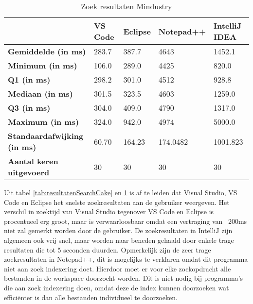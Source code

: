 \begin{table}[h!]
	\centering
	\begin{tabular}{ l l l l l }
		\hline
		                                    & \textbf{VS Code} & \textbf{Eclipse} & \textbf{Notepad++} & \textbf{IntelliJ IDEA} \\
		\hline
		\textbf{Gemiddelde (in ms)}         & 283.7            & 387.7            & 4643               & 1452.1                 \\[1ex]

		\textbf{Minimum (in ms) }           & 106.0            & 289.0            & 4425               & 820.0                  \\
		\textbf{Q1 (in ms)}                 & 298.2            & 301.0            & 4512               & 928.8                  \\
		\textbf{Mediaan (in ms)}            & 301.5            & 323.5            & 4603               & 1259.0                 \\
		\textbf{Q3 (in ms)}                 & 304.0            & 409.0            & 4790               & 1317.0                 \\
		\textbf{Maximum (in ms)}            & 324.0            & 942.0            & 4974               & 5000.0                 \\[1ex]

		\textbf{Standaardafwijking (in ms)} & 60.70            & 164.23           & 174.0482           & 1001.823               \\
		\textbf{Aantal keren uitgevoerd}    & 30               & 30               & 30                 & 30                     \\
		\hline
	\end{tabular}
	\caption{Zoek resultaten Mindustry}
	\label{tab:resultatenSearchMindustry}
\end{table}

Uit tabel \ref{tab:resultatenSearchCake} en \ref{tab:resultatenSearchMindustry} is af te leiden dat Visual Studio, VS Code en Eclipse het snelste zoekresultaten aan de gebruiker weergeven. Het verschil in zoektijd van Visual Studio tegenover VS Code en Eclipse is procentueel erg groot, maar is verwaarloosbaar omdat een vertraging van ~200ms niet zal gemerkt worden door de gebruiker. De zoekresultaten in IntelliJ zijn algemeen ook vrij snel, maar worden naar beneden gehaald door enkele trage resultaten die tot 5 seconden duurden. Opmerkelijk zijn de zeer trage zoekresultaten in Notepad++, dit is mogelijks te verklaren omdat dit programma niet aan zoek   indexering doet. Hierdoor moet er voor elke zoekopdracht alle bestanden in de workspace doorzocht worden. Dit is niet nodig bij programma's die aan zoek indexering doen, omdat deze de index kunnen doorzoeken wat efficiënter is dan alle bestanden individueel te doorzoeken.


